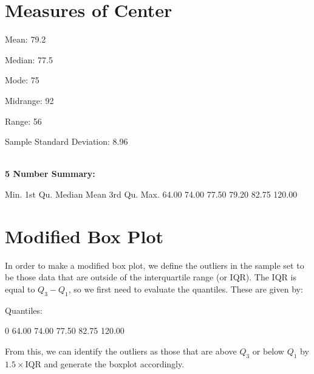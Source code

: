 \documentclass[twocolumn,english]{IEEEtran}
\theoremstyle{plain}
\theoremstyle{plain}
\begin{document}
\section{Measures of Center}
\begin{Schunk}
\begin{Soutput}
Mean:  79.2
\end{Soutput}
\begin{Soutput}
Median:  77.5
\end{Soutput}
\begin{Soutput}
Mode:  75
\end{Soutput}
\begin{Soutput}
Midrange:  92
\end{Soutput}
\begin{Soutput}
Range:  56
\end{Soutput}
\begin{Soutput}
Sample Standard Deviation:  8.96
\end{Soutput}
\end{Schunk}

\noindent \hrulefill\\
\noindent \textbf{5 Number Summary:}
\begin{Schunk}
\begin{Soutput}
   Min. 1st Qu.  Median    Mean 3rd Qu.    Max. 
  64.00   74.00   77.50   79.20   82.75  120.00 
\end{Soutput}
\end{Schunk}
\noindent \hrulefill

\section{Modified Box Plot}
In order to make a modified box plot, we define the outliers in the sample set to be those data that are outside of the interquartile range (or IQR). The IQR is equal to $Q_3 - Q_1$, so we first need to evaluate the quantiles. These are given by:

Quantiles:
\begin{Schunk}
\begin{Soutput}
    0%
 64.00  74.00  77.50  82.75 120.00 
\end{Soutput}
\end{Schunk}

From this, we can identify the outliers as those that are above $Q_3$ or below $Q_1$ by $1.5\times$IQR and generate the boxplot accordingly.
\end{document}
